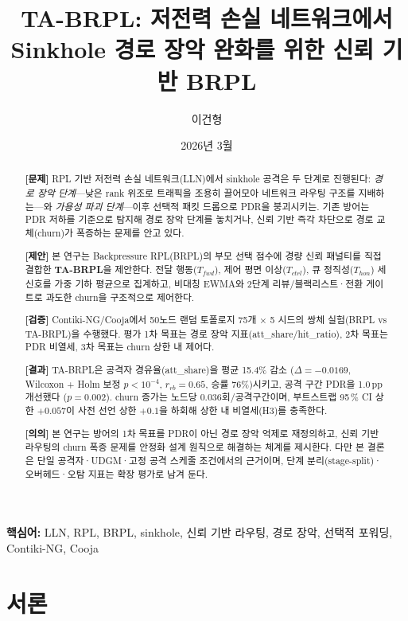 \documentclass[12pt,a4paper]{article}
\title{%
  \textbf{TA-BRPL: 저전력 손실 네트워크에서\\
  Sinkhole 경로 장악 완화를 위한 신뢰 기반 BRPL}%
}
\author{이건형}
\date{2026년 3월}
\begin{document}
\maketitle
\thispagestyle{empty}

\begin{abstract}
\noindent
\textbf{[문제]}
RPL 기반 저전력 손실 네트워크(LLN)에서 sinkhole 공격은
두 단계로 진행된다:
\emph{경로 장악 단계}---낮은 rank 위조로 트래픽을 조용히 끌어모아
네트워크 라우팅 구조를 지배하는---와
\emph{가용성 파괴 단계}---이후 선택적 패킷 드롭으로 PDR을 붕괴시키는.
기존 방어는 PDR 저하를 기준으로 탐지해 경로 장악 단계를 놓치거나,
신뢰 기반 즉각 차단으로 경로 교체(churn)가 폭증하는 문제를 안고 있다.

\textbf{[제안]}
본 연구는 Backpressure RPL(BRPL)의 부모 선택 점수에
경량 신뢰 패널티를 직접 결합한 \textbf{TA-BRPL}을 제안한다.
전달 행동($T_{fwd}$), 제어 평면 이상($T_{ctrl}$), 큐 정직성($T_{hon}$)
세 신호를 가중 기하 평균으로 집계하고,
비대칭 EWMA와 2단계 리뷰/블랙리스트·전환 게이트로
과도한 churn을 구조적으로 제어한다.

\textbf{[검증]}
Contiki-NG/Cooja에서 50노드 랜덤 토폴로지 75개 × 5 시드의
쌍체 실험(BRPL vs TA-BRPL)을 수행했다.
평가 1차 목표는 경로 장악 지표(att\_share/hit\_ratio), 2차 목표는
PDR 비열세, 3차 목표는 churn 상한 내 제어다.

\textbf{[결과]}
TA-BRPL은 공격자 경유율(att\_share)을 평균 15.4\% 감소
($\Delta = -0.0169$, Wilcoxon + Holm 보정 $p < 10^{-4}$,
$r_{rb} = 0.65$, 승률 76\%)시키고,
공격 구간 PDR을 1.0\,pp 개선했다 ($p = 0.002$).
churn 증가는 노드당 0.036회/공격구간이며,
부트스트랩 95\,\% CI 상한 $+0.057$이 사전 선언 상한 $+0.1$을 하회해
상한 내 비열세(H3)를 충족한다.

\textbf{[의의]}
본 연구는 방어의 1차 목표를 PDR이 아닌 경로 장악 억제로 재정의하고,
신뢰 기반 라우팅의 churn 폭증 문제를 안정화 설계 원칙으로
해결하는 체계를 제시한다.
다만 본 결론은 단일 공격자·UDGM·고정 공격 스케줄 조건에서의
근거이며, 단계 분리(stage-split)·오버헤드·오탐 지표는 확장 평가로 남겨 둔다.
\end{abstract}

\noindent\textbf{핵심어:}
LLN, RPL, BRPL, sinkhole, 신뢰 기반 라우팅, 경로 장악,
선택적 포워딩, Contiki-NG, Cooja

\clearpage
\tableofcontents
\clearpage


\section{서론}
\label{sec:intro}
\end{document}

